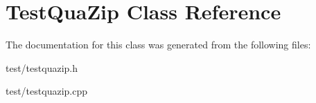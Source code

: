 \section{TestQuaZip Class Reference}
\label{classTestQuaZip}


The documentation for this class was generated from the following files:\begin{DoxyCompactItemize}
\item 
test/testquazip.h\item 
test/testquazip.cpp\end{DoxyCompactItemize}

